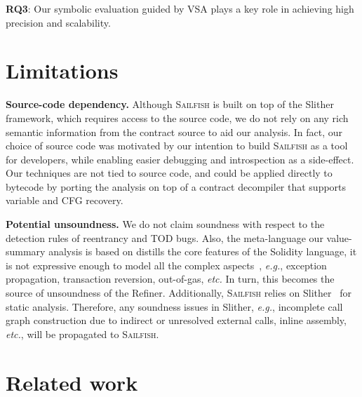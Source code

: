 \documentclass[conference, romanappendices]{tex/IEEEtran}
\theoremstyle{bfnote}
\newcommand{\toolname}{\textsc{Sailfish}\xspace}
\newcommand{\refiner}{{\sc Refiner}\xspace}
\newcommand{\slither}{{\sc Slither}\xspace}
\newcommand{\solidity}{{\sc Solidity}\xspace}
\newcommand{\reentrancy}{{reentrancy}\xspace}
\newcommand{\vsa}{{value-summary analysis}\xspace}
\newcommand{\etc}{\textit{etc.}}
\newcommand{\eg}{\textit{e.g.}}
\begin{document}
\begin{mdframed}[style=graybox]
	\textbf{RQ3}: Our symbolic evaluation guided by VSA plays a key role in achieving high precision and scalability.
\end{mdframed}






 	
\section{Limitations}

\noindent
\textbf{Source-code dependency.}
Although \toolname{} is built on top of the \slither~\cite{slither} framework, which requires access to the source code, we do not rely on any rich semantic information from the contract source to aid our analysis.
In fact, our choice of source code was motivated by our intention to build \toolname{} as a tool for developers, while enabling easier debugging and introspection as a side-effect.
Our techniques are not tied to source code, and could be applied directly to bytecode by porting the analysis on top of a contract decompiler that supports variable and CFG recovery.



\noindent
\textbf{Potential unsoundness.}
We do not claim soundness with respect to the detection rules of \reentrancy and {TOD\EndAccSupp{}} bugs.
Also, the meta-language our \vsa is based on distills the core features of the \solidity language, it is not expressive enough to model all the complex aspects~\cite{Jiao20}, \eg, exception propagation, transaction reversion, out-of-gas, \etc{}
In turn, this becomes the source of unsoundness of the \refiner.
Additionally, \toolname{} relies on \slither~\cite{slither} for static analysis.
Therefore, any soundness issues in \slither{}, \eg, incomplete call graph construction due to indirect or unresolved external calls, inline assembly, \etc, will be propagated to \toolname. 	\section{Related work}
\label{related_works}
\end{document}
